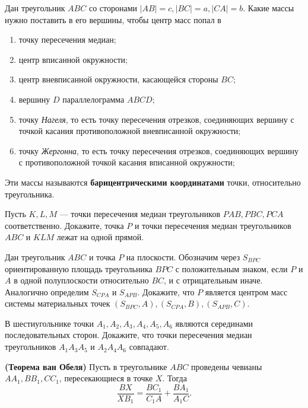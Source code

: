 \documentclass{article}
\begin{document}
\begin{enumerate_boxed}
        \item Дан треугольник $ABC$ со сторонами $|AB| = c, |BC| = a, |CA| = b$.
        Какие массы нужно поставить в его вершины, чтобы центр масс попал в
        \begin{enumerate}
            \item точку пересечения медиан;
            \item центр вписанной окружности;
            \item центр вневписанной окружности, касающейся стороны $BC$;
            \item вершину $D$ параллелограмма $ABCD$;
            \item точку \textit{Нагеля}, то есть точку пересечения отрезков, соединяющих вершину с точкой касания противоположной вневписанной окружности;
            \item точку \textit{Жергонна}, то есть точку пересечения отрезков, соединяющих вершину с противоположной точкой касания вписанной окружности;
        \end{enumerate}
        Эти массы называются \textbf{барицентрическими координатами} точки, относительно треугольника.

        \item Пусть $K, L, M$ — точки пересечения медиан треугольников $PAB, PBC, PCA$ соответственно.
        Докажите, точка $P$ и точки пересечения медиан треугольников $ABC$ и $KLM$ лежат на одной прямой.

        \item Дан треугольник $ABC$ и точка $P$ на плоскости.
        Обозначим через $S_{BPC}$ ориентированную площадь треугольника $BPC$ с положительным знаком, если $P$ и $A$ в одной полуплоскости относительно $BC$, и с отрицательным иначе. Аналогично определим $S_{CPA}$ и $S_{APB}$. Докажите, что $P$ является центром масс системы материальных точек $(S_{BPC},A), (S_{CPA},B), (S_{APB},C)$.

        \item В шестиугольнике точки $A_1, A_2, A_3, A_4, A_5, A_6$
        являются серединами последовательных сторон.
        Докажите, что точки пересечения медиан треугольников $A_{1}A_{3}A_5$ и $A_{2}A_{4}A_6$ совпадают.

        \item \textbf{(Теорема ван Обеля)} Пусть в треугольнике $ABC$
        проведены чевианы $AA_1, BB_1, CC_1$, пересекающиеся в точке $X$.
        Тогда
        \[
            \frac{BX}{XB_1}=\frac{BC_1}{C_{1}A}+\frac{BA_1}{A_{1}C}.
        \]


\end{enumerate_boxed}
\end{document}
